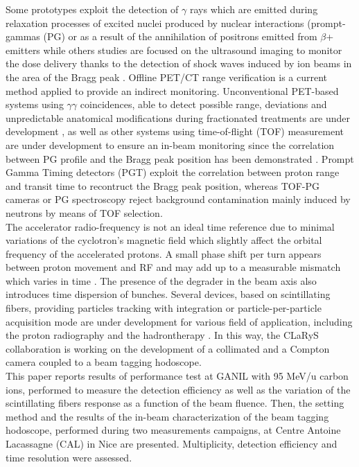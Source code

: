 \documentclass[a4paper,11pt]{article}
\begin{document}
Some prototypes exploit the detection of $\gamma$ rays which are emitted during  relaxation  processes of excited nuclei produced by nuclear interactions (prompt-gammas (PG) or as a result of the annihilation of positrons emitted from $\beta$+ emitters while others studies are focused on the ultrasound imaging to monitor the dose delivery thanks to the detection of shock waves induced by ion beams in the area of the Bragg peak \cite{Hickling2018}. Offline PET/CT range verification is a current method applied to provide an indirect monitoring. Unconventional PET-based systems using $\gamma\gamma$ coincidences, able to detect possible range, deviations and unpredictable anatomical modifications during fractionated treatments are under development \cite{Crespo2005, Parodi2015}, as well as other systems using time-of-flight (TOF) measurement are under development to ensure an in-beam monitoring since the correlation between PG profile and the Bragg peak position has been demonstrated \cite{Testa2008}. Prompt Gamma Timing detectors (PGT) exploit the correlation between proton range and transit time to recontruct the Bragg peak position\cite{Marcatili2020}, whereas TOF-PG cameras or PG spectroscopy reject background contamination mainly induced by neutrons  by means of TOF selection. \\

The accelerator radio-frequency is not an ideal time reference due to minimal variations of the cyclotron’s magnetic field which slightly affect the orbital frequency of the accelerated protons. A small phase shift per turn appears between proton movement and RF and may add up to a measurable mismatch which varies in time \cite{Werner2019}. The presence of the degrader in the beam axis also introduces time dispersion of bunches. Several devices, based on scintillating fibers, providing particles tracking with integration \cite{Leverington2018} or particle-per-particle \cite{Horikawa2004, Achenbach2008, Braccini2012} acquisition mode are under development for various field of application, including the proton radiography \cite{Presti2013} and the hadrontherapy \cite{PAPA2016}. 
In this way, the CLaRyS collaboration is working on the development of a collimated and a Compton camera coupled to a beam tagging hodoscope.\\

This paper reports results of performance test at GANIL with 95 MeV/u carbon ions, performed to measure the detection efficiency as well as the variation of the scintillating fibers response as a function of the beam fluence. Then, the setting method and the results of the in-beam characterization of the beam tagging hodoscope, performed during two measurements campaigns, at Centre Antoine Lacassagne (CAL) in Nice are presented. Multiplicity, detection efficiency and time resolution were assessed.
\end{document}
